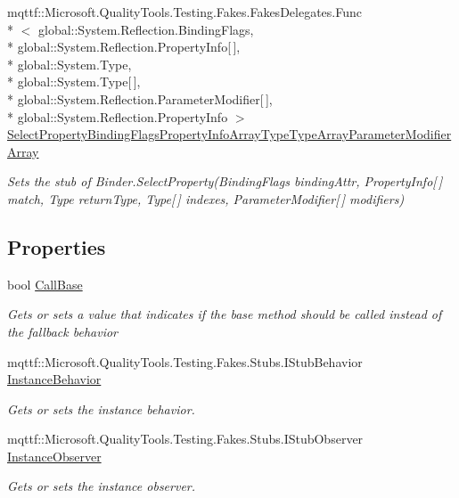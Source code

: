 \begin{DoxyCompactItemize}
mqttf\-::\-Microsoft.\-Quality\-Tools.\-Testing.\-Fakes.\-Fakes\-Delegates.\-Func\\*
$<$ global\-::\-System.\-Reflection.\-Binding\-Flags, \\*
global\-::\-System.\-Reflection.\-Property\-Info\mbox{[}$\,$\mbox{]}, \\*
global\-::\-System.\-Type, \\*
global\-::\-System.\-Type\mbox{[}$\,$\mbox{]}, \\*
global\-::\-System.\-Reflection.\-Parameter\-Modifier\mbox{[}$\,$\mbox{]}, \\*
global\-::\-System.\-Reflection.\-Property\-Info $>$ \hyperlink{class_system_1_1_reflection_1_1_fakes_1_1_stub_binder_aa5b342cf78926641e0510eca4ed6d9c8}{Select\-Property\-Binding\-Flags\-Property\-Info\-Array\-Type\-Type\-Array\-Parameter\-Modifier\-Array}
\begin{DoxyCompactList}\small\item\em Sets the stub of Binder.\-Select\-Property(\-Binding\-Flags binding\-Attr, Property\-Info\mbox{[}$\,$\mbox{]} match, Type return\-Type, Type\mbox{[}$\,$\mbox{]} indexes, Parameter\-Modifier\mbox{[}$\,$\mbox{]} modifiers)\end{DoxyCompactList}\end{DoxyCompactItemize}
\subsection*{Properties}
\begin{DoxyCompactItemize}
\item 
bool \hyperlink{class_system_1_1_reflection_1_1_fakes_1_1_stub_binder_aca61daf2798a1da4828fe3ed915e0591}{Call\-Base}
\begin{DoxyCompactList}\small\item\em Gets or sets a value that indicates if the base method should be called instead of the fallback behavior\end{DoxyCompactList}\item 
mqttf\-::\-Microsoft.\-Quality\-Tools.\-Testing.\-Fakes.\-Stubs.\-I\-Stub\-Behavior \hyperlink{class_system_1_1_reflection_1_1_fakes_1_1_stub_binder_a992eacd7ac5d72c5f5107b23f32531fa}{Instance\-Behavior}
\begin{DoxyCompactList}\small\item\em Gets or sets the instance behavior.\end{DoxyCompactList}\item 
mqttf\-::\-Microsoft.\-Quality\-Tools.\-Testing.\-Fakes.\-Stubs.\-I\-Stub\-Observer \hyperlink{class_system_1_1_reflection_1_1_fakes_1_1_stub_binder_a75993d1cd02bd4398dc394d1308eabe1}{Instance\-Observer}
\begin{DoxyCompactList}\small\item\em Gets or sets the instance observer.\end{DoxyCompactList}\end{DoxyCompactItemize}


